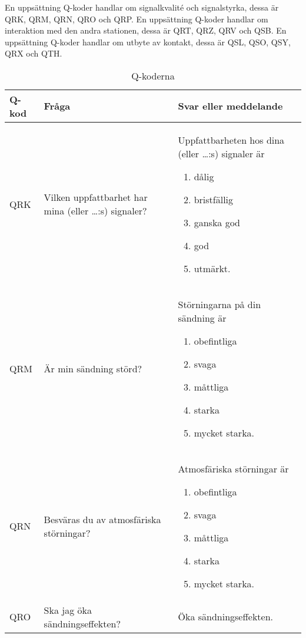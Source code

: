 En uppsättning Q-koder handlar om signalkvalité och signalstyrka, dessa är
QRK, QRM, QRN, QRO och QRP.
En uppsättning Q-koder handlar om interaktion med den andra stationen,
dessa är QRT, QRZ, QRV och QSB.
En uppsättning Q-koder handlar om utbyte av kontakt, dessa är QSL, QSO,
QSY, QRX och QTH.

\begin{table}
  \label{tab:q-kod}
  \caption{Q-koderna}
  \begin{tabular}{lp{6cm}p{6cm}}
    Q-kod & Fråga & Svar eller meddelande \\
    \hline
    QRK &
    Vilken uppfattbarhet har mina (eller \dots:s) signaler?
    &
    Uppfattbarheten hos dina (eller \dots:s) signaler är
    \vspace{-\topsep}
    \begin{enumerate}[noitemsep]
    \item dålig
    \item bristfällig
    \item ganska god
    \item god
    \item utmärkt.
    \end{enumerate} \\
    QRM &
    Är min sändning störd?
    &
    Störningarna på din sändning är
    \vspace{-\topsep}
    \begin{enumerate}[noitemsep]
    \item obefintliga
    \item svaga
    \item måttliga
    \item starka
    \item mycket starka.
    \end{enumerate} \\
    QRN
    &
    Besväras du av atmosfäriska störningar?
    &
    Atmosfäriska störningar är
    \vspace{-\topsep}
    \begin{enumerate}[noitemsep]
    \item obefintliga
    \item svaga
    \item måttliga
    \item starka
    \item mycket starka.
    \end{enumerate} \\
    QRO
    &
    Ska jag öka sändningseffekten?
    &
    Öka sändningseffekten.
    \\

\end{tabular}
\end{table}
